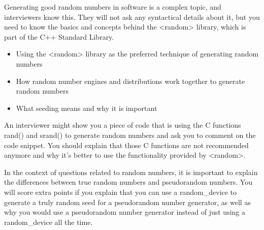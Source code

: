 
Generating good random numbers in software is a complex topic, and interviewers know this. They will not ask any syntactical details about it, but you need to know the basics and concepts behind the <random> library, which is part of the C++ Standard Library.


\begin{itemize}
\item
Using the <random> library as the preferred technique of generating random numbers

\item
How random number engines and distributions work together to generate random numbers

\item
What seeding means and why it is important
\end{itemize}


An interviewer might show you a piece of code that is using the C functions rand() and srand() to generate random numbers and ask you to comment on the code snippet. You should explain that those C functions are not recommended anymore and why it’s better to use the functionality provided by <random>.

In the context of questions related to random numbers, it is important to explain the differences between true random numbers and pseudorandom numbers. You will score extra points if you explain that you can use a random\_device to generate a truly random seed for a pseudorandom number generator, as well as why you would use a pseudorandom number generator instead of just using a random\_device all the time.

